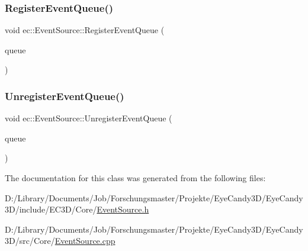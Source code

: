\mbox{\label{classec_1_1_event_source_ab507e7ed5da766e1f4487375997c57ca}} 
\subsubsection{\texorpdfstring{Register\+Event\+Queue()}{RegisterEventQueue()}}
{\footnotesize\ttfamily void ec\+::\+Event\+Source\+::\+Register\+Event\+Queue (\begin{DoxyParamCaption}\item[{\mbox{\hyperlink{classec_1_1_event_queue}{Event\+Queue}} $\ast$}]{queue }\end{DoxyParamCaption})}

\mbox{\label{classec_1_1_event_source_ad167ece0710a964d09c7d61faae641df}} 
\subsubsection{\texorpdfstring{Unregister\+Event\+Queue()}{UnregisterEventQueue()}}
{\footnotesize\ttfamily void ec\+::\+Event\+Source\+::\+Unregister\+Event\+Queue (\begin{DoxyParamCaption}\item[{\mbox{\hyperlink{classec_1_1_event_queue}{Event\+Queue}} $\ast$}]{queue }\end{DoxyParamCaption})}



The documentation for this class was generated from the following files\+:\begin{DoxyCompactItemize}
\item 
D\+:/\+Library/\+Documents/\+Job/\+Forschungsmaster/\+Projekte/\+Eye\+Candy3\+D/\+Eye\+Candy3\+D/include/\+E\+C3\+D/\+Core/\mbox{\hyperlink{_event_source_8h}{Event\+Source.\+h}}\item 
D\+:/\+Library/\+Documents/\+Job/\+Forschungsmaster/\+Projekte/\+Eye\+Candy3\+D/\+Eye\+Candy3\+D/src/\+Core/\mbox{\hyperlink{_event_source_8cpp}{Event\+Source.\+cpp}}\end{DoxyCompactItemize}
